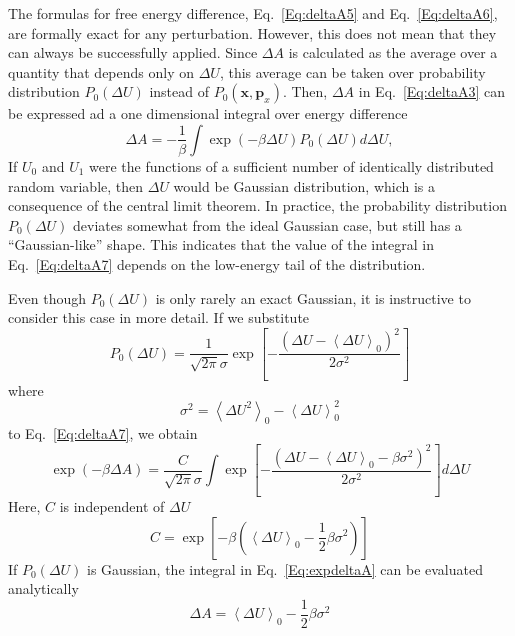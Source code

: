 The formulas for free energy difference, Eq.~\ref{Eq:deltaA5} and Eq.~\ref{Eq:deltaA6}, are formally exact for any perturbation. However, this does not mean that they can always be successfully applied. Since $\Delta A$ is calculated as the average over a quantity that depends only on $\Delta U$, this average can be taken over probability distribution $P_0(\Delta U)$ instead of $P_{0}(\textbf{x},\textbf{p}_{x})$. Then, $\Delta A$ in Eq.~\ref{Eq:deltaA3} can be expressed ad a one dimensional integral over energy difference
\begin{equation}
\Delta A = -\frac{1}{\beta} \int \exp(-\beta \Delta U) P_{0}(\Delta U) d\Delta U,
\label{Eq:deltaA7}
\end{equation}
If $U_{0}$ and $U_{1}$ were the functions of a sufficient number of identically distributed random variable, then $\Delta U$ would be Gaussian distribution, which is a consequence of the central limit theorem. In practice, the probability distribution $P_{0}(\Delta U)$ deviates somewhat from the ideal Gaussian case, but still has a ``Gaussian-like'' shape. This indicates that the value of the integral in Eq.~\ref{Eq:deltaA7} depends on the low-energy tail of the distribution.

Even though $P_{0}(\Delta U)$ is only rarely an exact Gaussian, it is instructive to consider this case in more detail. If we substitute
\begin{equation}
P_{0}(\Delta U) = \frac{1}{\sqrt{2\pi}\sigma}\exp{\left[-\frac{(\Delta U - \left \langle \Delta U \right \rangle_{0})^2}{2\sigma^2}\right]}
\label{Eq:gaussian}
\end{equation}
where
\begin{equation}
\sigma^2 = \left \langle \Delta U^2 \right \rangle_{0} - \left \langle \Delta U \right \rangle_{0}^2
\label{Eq:variance}
\end{equation}
to Eq.~\ref{Eq:deltaA7}, we obtain
\begin{equation}
\exp(-\beta \Delta A) = \frac{C}{\sqrt{2\pi}\sigma} \int \exp{\left[-\frac{(\Delta U - \left \langle \Delta U \right \rangle_{0} - \beta \sigma ^2)^2}{2\sigma^2}\right]} d\Delta U
\label{Eq:expdeltaA}
\end{equation}
Here, $C$ is independent of $\Delta U$
\begin{equation}
C = \exp{\left[-\beta (\left \langle \Delta U \right \rangle_{0} - \frac{1}{2} \beta \sigma ^2)\right]}
\label{Eq:C}
\end{equation}
If $P_{0}(\Delta U)$ is Gaussian, the integral in Eq.~\ref{Eq:expdeltaA} can be evaluated analytically
\begin{equation}
\Delta A = \left \langle \Delta U \right \rangle_{0} - \frac{1}{2} \beta \sigma ^2
\label{Eq:deltaA8}
\end{equation}